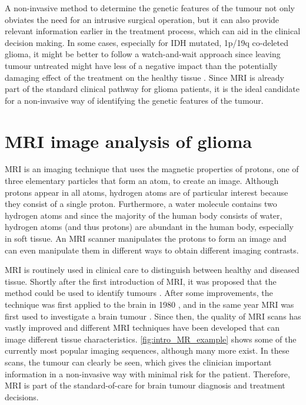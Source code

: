 A non-invasive method to determine the genetic features of the tumour not only obviates the need for an intrusive surgical operation, but it can also provide relevant information earlier in the treatment process, which can aid in the clinical decision making.
In some cases, especially for IDH mutated, 1p/19q co-deleted glioma, it might be better to follow a watch-and-wait approach since leaving tumour untreated might have less of a negative impact than the potentially damaging effect of the treatment on the healthy tissue \autocite{vandenbent2012lggtreatment, welle2017EANO}.
Since \gls{MRI} is already part of the standard clinical pathway for glioma patients, it is the ideal candidate for a non-invasive way of identifying the genetic features of the tumour.

\section{MRI image analysis of glioma}

\gls{MRI} is an imaging technique that uses the magnetic properties of protons, one of three elementary particles that form an atom, to create an image.
Although protons appear in all atoms, hydrogen atoms are of particular interest because they consist of a single proton.
Furthermore, a water molecule contains two hydrogen atoms and since the majority of the human body consists of water, hydrogen atoms (and thus protons) are abundant in the human body, especially in soft tissue.
An \gls{MRI} scanner manipulates the protons to form an image and can even manipulate them in different ways to obtain different imaging contrasts.

\gls{MRI} is routinely used in clinical care to distinguish between healthy and diseased tissue.
Shortly after the first introduction of \gls{MRI}, it was proposed that the method could be used to identify tumours \autocite{damadian1971tumour}.
After some improvements, the technique was first applied to the brain in 1980 \autocite{holland1980brain}, and in the same year MRI was first used to investigate a brain tumour \autocite{hawkes1980NMRbrain}.
Since then, the quality of \gls{MRI} scans has vastly improved and different \gls{MRI} techniques have been developed that can image different tissue characteristics.
\cref{fig:intro_MR_example} shows some of the currently most popular imaging sequences, although many more exist.
In these scans, the tumour can clearly be seen, which gives the clinician important information in a non-invasive way with minimal risk for the patient.
Therefore, \gls{MRI} is part of the standard-of-care for brain tumour diagnosis and treatment decisions.

